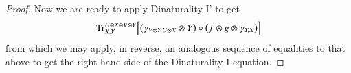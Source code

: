 \documentclass{amsart}
\newcommand{\erase}[1]{{}}
\def\tn{\textnormal}
\def\Trace{\tn{Tr}}
\theoremstyle{remark}
\theoremstyle{definition}
\begin{document}
\begin{proof}
 Now we are ready to apply Dinaturality I' to get
 \begin{align*}
  \Trace^{U\otimes X\otimes V\otimes Y}_{X,Y}\Big[\big(\gamma_{V\otimes Y,U\otimes X}\otimes Y\big)\circ\big(f\otimes g\otimes \gamma_{Y,X}\big)\Big]
 \end{align*}
 from which we may apply, in reverse, an analogous sequence of equalities to that above to get the right hand side of the Dinaturality I equation.
 \erase{\begin{align*}%
  &=\Trace^Y_{X,Y}\bigg[\Trace^{U\otimes X\otimes V}_{Y\otimes X,Y\otimes Y}\Big[\big(\gamma_{V\otimes Y,U\otimes X}\otimes Y\big)\circ\big(f\otimes g\otimes \gamma_{Y,X}\big)\Big]\bigg]\\
  &=\Trace^Y_{X,Y}\bigg[\Trace^{U\otimes X\otimes V}_{Y\otimes X,Y\otimes Y}\Big[\big(\gamma_{V\otimes Y,U\otimes X}\otimes Y\big)\circ\big(f\otimes g\otimes X\otimes Y\big)\circ\big(U\otimes X\otimes V\otimes \gamma_{Y,X}\big)\Big]\bigg]\\
  &=\Trace^Y_{X,Y}\bigg[\Trace^{U\otimes X\otimes V}_{X\otimes Y,Y\otimes Y}\Big[\big(\gamma_{V\otimes Y,U\otimes X}\otimes Y\big)\circ\big(f\otimes g\otimes X\otimes Y\big)\Big]\circ\gamma_{Y,X}\bigg]\\
  &=\Trace^Y_{X,Y}\Bigg[\bigg(\Trace^{U\otimes X\otimes V}_{X,Y}\Big[\gamma_{V\otimes Y,U\otimes X}\circ\big(f\otimes g\otimes X\big)\Big]\otimes Y\bigg)\circ\gamma_{Y,X}\Bigg]\\
  &=\Trace^Y_{X,Y}\Bigg[\gamma_{Y,Y}\circ\bigg(Y\otimes\Trace^{U\otimes X\otimes V}_{X,Y}\Big[\gamma_{V\otimes Y,U\otimes X}\circ\big(f\otimes g\otimes X\big)\Big]\bigg)\Bigg]\\
  &=\Trace^Y_{Y,Y}\big[\gamma_{Y,Y}\big]\circ\Trace^{U\otimes X\otimes V}_{X,Y}\Big[\gamma_{V\otimes Y,U\otimes X}\circ\big(f\otimes g\otimes X\big)\Big]\\
  &=\Trace^{U\otimes X\otimes V}_{X,Y}\Big[\gamma_{V\otimes Y,U\otimes X}\circ\big(f\otimes g\otimes X\big)\Big]\\
  &=\Trace^{U\otimes X\otimes V}_{X,Y}\Big[\big(g\otimes X\otimes f\big)\circ\gamma_{U\otimes X,V\otimes X}\Big]\\
  &=\Trace^V_{X,Y}\bigg[\Trace^{U\otimes X}_{V\otimes X,V\otimes Y}\Big[\big(g\otimes X\otimes f\big)\circ\gamma_{U\otimes X, V\otimes X}\Big]\bigg]\\
  &=\Trace^V_{X,Y}\Big[f\circ\big(g\otimes X\big)\Big].
 \end{align*}}%
 \erase{By Dinaturality I' this becomes%
}
\end{proof}
\end{document}

